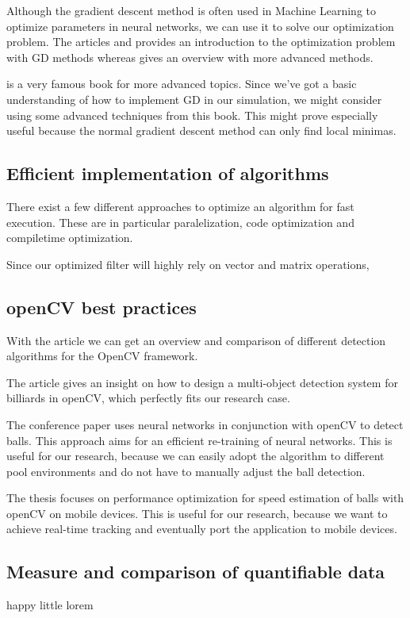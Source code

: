 \documentclass[titlepage, a4paper, 11pt]{scrartcl}
\begin{document}
Although the gradient descent method is often used in Machine Learning to optimize parameters in neural networks, we can use it to solve our optimization problem.
The articles \citep{ketkar2017deep} and \citep{marti2005stochastic} provides an introduction to the optimization problem with GD methods whereas \citep{marti2005stochastic} gives an overview with more advanced methods.

\citep{bishop2006pattern} is a very famous book for more advanced topics. Since we've got a basic understanding of how to implement GD in our simulation, we might consider using 
some advanced techniques from this book. This might prove especially useful because the normal gradient descent method can only find local minimas.

\subsection{Efficient implementation  of  algorithms}

There exist a few different approaches to optimize an algorithm for fast execution. These are in particular paralelization, code optimization and compiletime optimization.

Since our optimized filter will highly rely on vector and matrix operations,

\subsection{openCV best practices}

With the article \citep{janku2016comparison} we can get an overview and comparison of different detection algorithms for the OpenCV framework.

The article \citep{gao2018design} gives an insight on how to design a multi-object detection system for billiards in openCV, which perfectly fits our research case.

The conference paper \citep{gabel2018jetson} uses neural networks in conjunction with openCV to detect balls.
This approach aims for an efficient re-training of neural networks. This is useful for our research, because we can easily adopt the algorithm to different pool environments and do not have to manually adjust the ball detection.

The thesis \citep{schmidt2016measuring} focuses on performance optimization for speed estimation of balls with openCV on mobile devices. This is useful for our research, because we want to achieve real-time tracking and eventually port the application to mobile devices.

\subsection{Measure and comparison of quantifiable data}

happy little lorem

 

\end{document}

